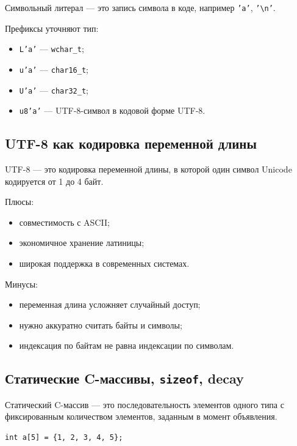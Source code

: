 \begin{definition}
Символьный литерал — это запись символа в коде, например \texttt{'a'}, \texttt{'\textbackslash n'}.
\end{definition}

Префиксы уточняют тип:
\begin{itemize}
    \item \texttt{L'a'} — \texttt{wchar\_t};
    \item \texttt{u'a'} — \texttt{char16\_t};
    \item \texttt{U'a'} — \texttt{char32\_t};
    \item \texttt{u8'a'} — UTF-8-символ в кодовой форме UTF-8.
\end{itemize}

\subsection{UTF-8 как кодировка переменной длины}
UTF-8 — это кодировка переменной длины, в которой один символ Unicode кодируется от 1 до 4 байт.

Плюсы:
\begin{itemize}
    \item совместимость с ASCII;
    \item экономичное хранение латиницы;
    \item широкая поддержка в современных системах.
\end{itemize}

Минусы:
\begin{itemize}
    \item переменная длина усложняет случайный доступ;
    \item нужно аккуратно считать байты и символы;
    \item индексация по байтам не равна индексации по символам.
\end{itemize}

\subsection{Статические C-массивы, \texttt{sizeof}, decay}
\begin{definition}[C-массив]
Статический C-массив — это последовательность элементов одного типа с фиксированным количеством элементов, заданным в момент объявления.
\end{definition}

\begin{example}
\begin{verbatim}
int a[5] = {1, 2, 3, 4, 5};
\end{verbatim}
\end{example}

